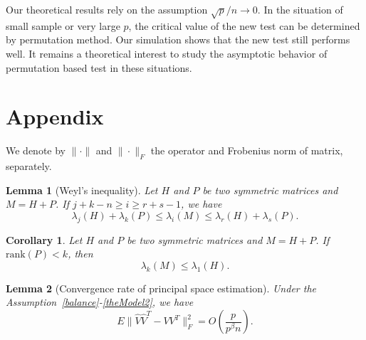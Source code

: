 \documentclass[review]{elsarticle}
\theoremstyle{plain}
\newtheorem{corollary}{\quad\quad Corollary}
\newtheorem{lemma}{\quad\quad Lemma}
\theoremstyle{definition}
\theoremstyle{remark}
\begin{document}
Our theoretical results rely on the assumption $\sqrt{p}/n\to 0$. In the situation of small sample or very large $p$, the critical value of the new test can be determined by permutation method. Our simulation shows that the new test still performs well. It remains a theoretical interest to study the asymptotic behavior of permutation based test in these situations.



\section*{Appendix}
We denote by $\|\cdot \|$ and $\|\cdot\|_F$ the operator and Frobenius  norm of matrix, separately.


\begin{lemma}[Weyl's inequality]
Let $H$ and $P$ be two symmetric matrices and $M=H+P$. If $j+k-n\geq i\geq r+s-1$, we have
\begin{equation*}
\lambda_j(H)+\lambda_k(P)\leq \lambda_i(M) \leq \lambda_r(H)+\lambda_s(P).
\end{equation*}
\end{lemma}
\begin{corollary}\label{WeylCor}
    Let $H$ and $P$ be two symmetric matrices and $M=H+P$. If $\mathrm{rank}(P)< k$, then
    \begin{equation*}
        \lambda_k(M)\leq \lambda_1(H).
    \end{equation*}
\end{corollary}


\begin{lemma}[Convergence rate of principal space estimation]\label{conRateLemma}
    Under the Assumption~\ref{balance}-\ref{theModel2}, we have
\begin{equation*}
E\|\hat{V}\hat{V}^T-VV^T\|^2_F =O(\frac{p}{p^{\beta}n}).
\end{equation*}
\end{lemma}
\end{document}
